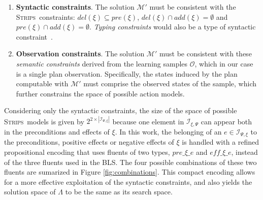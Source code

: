 \documentclass[runningheads]{llncs}
\newcommand{\strips}{\textsc{Strips}}     %
\begin{document}
\begin{enumerate}
\item {\bf Syntactic constraints}. The solution $\mathcal{M}'$ must be consistent with the \strips\ constraints: $del(\xi)\subseteq pre(\xi)$, $del(\xi)\cap add(\xi)=\emptyset$ and $pre(\xi)\cap add(\xi)=\emptyset$. {\em Typing constraints} would also be a type of syntactic constraint~\cite{mcdermott1998pddl}.
\item {\bf Observation constraints}. The solution $\mathcal{M}'$ must be consistent with these \emph{semantic constraints} derived from  the learning samples $\mathcal{O}$, which in our case is a single plan observation. Specifically, the states induced by the plan computable with $\mathcal{M}'$ must comprise the observed states of the sample, which further constrains the space of possible action models.
\end{enumerate}

Considering only the syntactic constraints, the size of the space of possible \strips\ models is given by $2^{2\times|{\mathcal I}_{\Psi,\xi}|}$ because one element in $\mathcal{I}_{\xi,\Psi}$ can appear both in the preconditions and effects of $\xi$. In this work, the belonging of an $e \in \mathcal{I}_{\Psi,\xi}$ to the preconditions, positive effects or negative effects of $\xi$ is handled with a refined propositional encoding that uses fluents of two types, $pre\_\xi\_e$ and $eff\_\xi\_e$, instead of the three fluents used in the BLS. The four possible combinations of these two fluents are sumarized in Figure \ref{fig:combinations}. This compact encoding allows for a more effective exploitation of the syntactic constraints, and also yields the solution space of $\Lambda$ to be the same as its search space.
\end{document}
